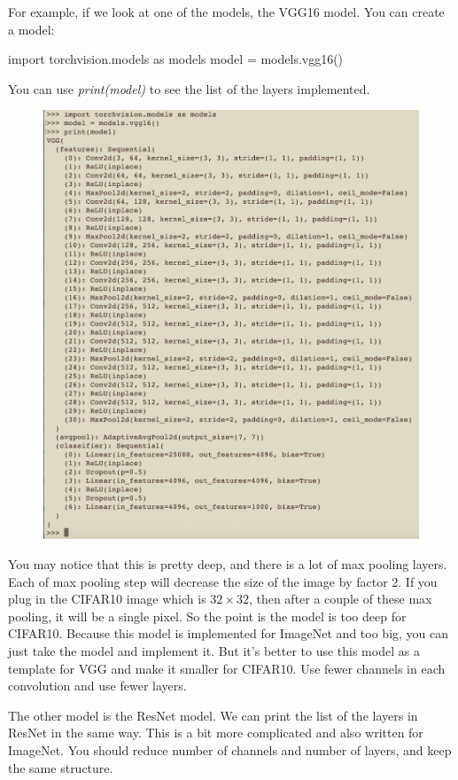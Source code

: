 For example, if we look at one of the models, the VGG16 model. You can create a model:
\begin{python}
import torchvision.models as models
model = models.vgg16()
\end{python}
You can use \emph{print(model)} to see the list of the layers implemented.
\begin{figure}
\begin{center}
\includegraphics[scale=0.5]{../figures/497Proj_vgg16}
\end{center}
\end{figure}
You may notice that this is pretty deep, and there is a lot of max pooling layers. Each of max pooling step will decrease the size of the image by factor 2. If you plug in the CIFAR10
image which is $32\times 32$, then after a couple of these max pooling, it will be a single pixel. So the point is the model is too deep for CIFAR10. Because this model is implemented for ImageNet and too big, you can just take the model and implement it. But it's better to use this model as a template for VGG and make it smaller for CIFAR10. Use fewer channels in each convolution and use fewer layers.

The other model is the ResNet model. We can print the list of the layers in ResNet in the same way. 
This is a bit more complicated and also written for ImageNet. You should reduce number of channels and number of layers, and keep the same structure.



